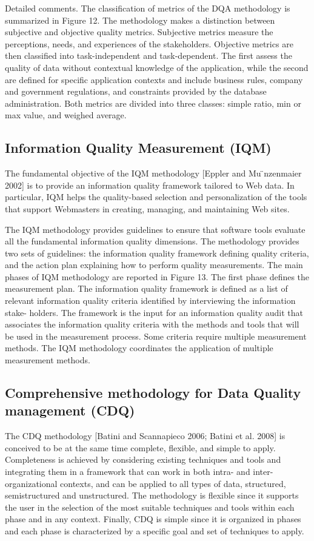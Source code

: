 \documentclass[pdftex,english,oribibl]{llncs}
\begin{document}
Detailed comments. The classification of metrics of the DQA methodology is summarized in Figure 12. The methodology makes a distinction between subjective and objective quality metrics. Subjective metrics measure the perceptions, needs, and experiences of the stakeholders. Objective metrics are then classified into task-independent and task-dependent. The first assess the quality of data without contextual knowledge of the application, while the second are defined for specific application contexts and include business rules, company and government regulations, and constraints provided by the database administration. Both metrics are divided into three classes: simple ratio, min or max value, and weighed average.


\subsection{Information Quality Measurement (IQM)}
The fundamental objective of the IQM methodology [Eppler and Mu ̈nzenmaier 2002] is to provide an information quality framework tailored to Web data.
In particular, IQM helps the quality-based selection and personalization of the tools that support Webmasters in creating, managing, and maintaining Web sites.

The IQM methodology provides guidelines to ensure that software tools evaluate all the fundamental information quality dimensions.
The methodology provides two sets of guidelines: the information quality framework defining quality criteria, and the action plan explaining how to perform quality measurements.
The main phases of IQM methodology are reported in Figure 13. The first phase defines the measurement plan.
The information quality framework is defined as a list of relevant information quality criteria identified by interviewing the information stake- holders.
The framework is the input for an information quality audit that associates the information quality criteria with the methods and tools that will be used in the measurement process.
Some criteria require multiple measurement methods. The IQM methodology coordinates the application of multiple measurement methods.

\subsection{Comprehensive methodology for Data Quality management (CDQ)}

The CDQ methodology [Batini and Scannapieco 2006; Batini et al. 2008] is conceived to be at the same time complete, flexible, and simple to apply.
Completeness is achieved by considering existing techniques and tools and integrating them in a framework that can work in both intra- and inter-organizational contexts, and can be applied to all types of data, structured, semistructured and unstructured.
The methodology is flexible since it supports the user in the selection of the most suitable techniques and tools within each phase and in any context.
Finally, CDQ is simple since it is organized in phases and each phase is characterized by a specific goal and set of techniques to apply.
\end{document}
